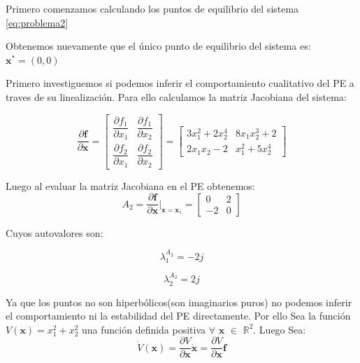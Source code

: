 \documentclass[10pt]{article}
\begin{document}
Primero comenzamos calculando los puntos de equilibrio del sistema \eqref{eq:problema2}

Obtenemos nuevamente que el único punto de equilibrio del sistema es: $\mathbf{x}^{*} = (0,0)$

Primero investiguemos si podemos inferir el comportamiento cualitativo del PE a traves de su linealización. Para ello calculamos 
la matriz Jacobiana del  sistema:




\begin{equation}
\dfrac{\partial \mathbf{f}}{\partial \mathbf{x}}=
\begin{bmatrix}
 \dfrac{\partial f_1}{\partial x_1}& \dfrac{\partial f_1}{\partial x_2} \\ 
\dfrac{\partial f_2}{\partial x_1}& \dfrac{\partial f_2}{\partial x_2}
\end{bmatrix} 
=
\begin{bmatrix}
  3 x_{1}^{2} + 2 x_{2}^{4} & 8 x_{1} x_{2}^{3} + 2\\
 2 x_{1} x_{2} - 2 & x_{1}^{2} + 5 x_{2}^{4}
\end{bmatrix}
\label{eq:jaco_sis2}
\end{equation}



Luego al evaluar la matriz Jacobiana en el PE obtenemos:
\begin{equation}
A_2=\dfrac{\partial \mathbf{f}}{\partial \mathbf{x}}\bigg\vert_{\mathbf{x}=\mathbf{x}_1}=
\begin{bmatrix}
0 & 2 \\
-2& 0
\end{bmatrix}
\label{eq:jaco_sis_2}
\end{equation}


Cuyos autovalores son:

\begin{equation}
    \lambda_{1}^{A_{2}}=-2j    \label{eq:raiz_1_2}
\end{equation}


\begin{equation}
    \lambda_{2}^{A_{2}}=2j \label{eq:raiz_2_2}
\end{equation}

Ya que los puntos no son hiperbólicos(son imaginarios puros) no podemos inferir el comportamiento ni la estabilidad del PE 
directamente. Por ello Sea la función $V(\mathbf{x}) = x_{1}^{2} + x_{2}^{2}$ una función definida positiva $\forall$ $\mathbf{x}$ $\in$ $\mathbb{R}^{2}$. Luego Sea:
\begin{equation}
    \dot{V}(\mathbf{x}) = \frac{\partial V}{\partial \mathbf{x}}\dot{\mathbf{x}}=\frac{\partial V}{\partial \mathbf{x}}\mathbf{f}
\end{equation}
\end{document}
